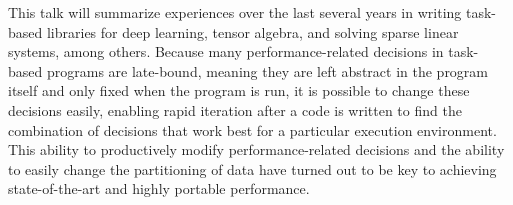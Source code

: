 This talk will summarize experiences over the last several years in writing task-based libraries for deep learning, tensor algebra, and solving sparse linear systems, among others. Because many performance-related decisions in task-based programs are late-bound, meaning they are left abstract in the program itself and only fixed when the program is run, it is possible to change these decisions easily, enabling rapid iteration after a code is written to find the combination of decisions that work best for a particular execution environment. This ability to productively modify performance-related decisions and the ability to easily change the partitioning of data have turned out to be key to achieving state-of-the-art and highly portable performance.